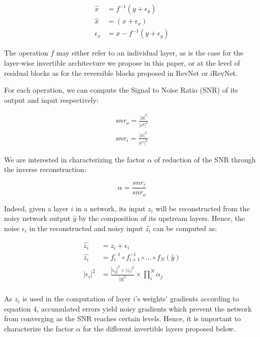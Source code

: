 \documentclass[twocolumn]{bmcart}
\begin{document}
 \begin{subequations}
   \begin{align}
   \hat{x} &= f^{-1}(y+\epsilon_y) \\
   \hat{x} &= (x+\epsilon_x) \\
   \epsilon_x &= x - f^{-1}(y+\epsilon_y)
   \end{align}
 \end{subequations}

The operation $f$ may either refer to an individual layer,
as is the case for the layer-wise invertible architecture we propose in this paper,
or at the level of residual blocks as for the reversible blocks proposed in RevNet or iRevNet.

For each operation, we can compute the Signal to Noise Ratio (SNR) of its output and input respectively:

\begin{subequations}
\begin{align}
snr_o = \frac{|y|^2}{|\epsilon^y|^2} \\
snr_i = \frac{|x|^2}{|\epsilon^x|^2}
\end{align}
\end{subequations}

We are interested in characterizing the factor $\alpha$ of reduction of the SNR through the inverse reconstruction:

\begin{equation}
\alpha = \frac{snr_i}{snr_o}
\end{equation}

Indeed, given a layer $i$ in a network, its input $z_i$ will be reconstructed
from the noisy network output $\hat{y}$ by the composition of its upstream layers.
Hence, the noise $\epsilon_i$ in the reconstructed and noisy input $\hat{z_i}$ can be computed as:

\begin{subequations}
\begin{align}
\hat{z_i}  &= z_i + \epsilon_i \\
\hat{z_i}  &=  f_i^{-1} \circ f_{i+1}^{-1} \circ ... \circ f_N(\hat{y})\\
| \epsilon_i |^2 &=  \frac{| \epsilon_y |^2 \times | z_i |^2}{| y |^2} \times \prod_i^{N} \alpha_j \\
\end{align}
\end{subequations}

As $z_i$ is used in the computation of layer $i$'s weights' gradients according to equation 4,
accumulated errors yield noisy gradients which prevent the network from converging as the SNR reaches certain levels.
Hence, it is important to characterize the factor $\alpha$ for the different invertible layers proposed below.
\end{document}
